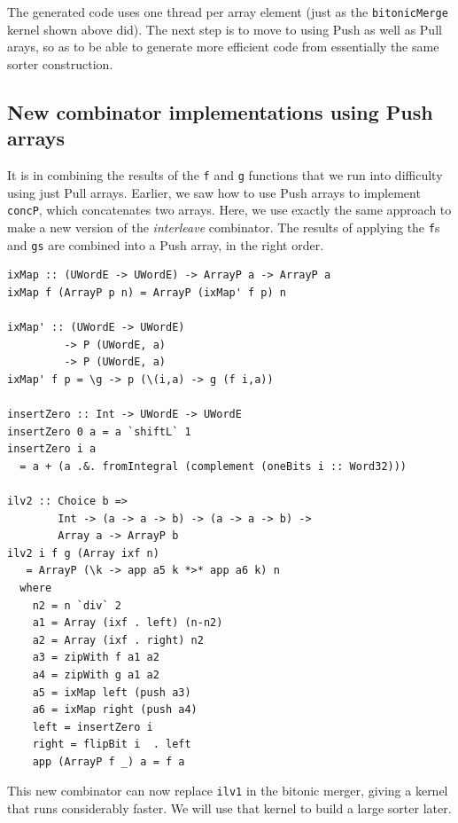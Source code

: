 The generated code
uses
one thread per array element (just as the {\tt bitonicMerge}
kernel shown above did). The next step is to move to using Push as
well as Pull arays, so as to be able to generate more efficient code
from essentially the same sorter construction.

\subsection{New combinator implementations using Push arrays}


It is in combining the results of the {\tt f} and {\tt g} functions
that we run into difficulty using just Pull arrays.
Earlier, we saw how to use Push arrays to implement {\tt concP},
which concatenates two arrays.
Here, we use exactly the same approach to make a new version of
the {\em interleave} combinator. The results of applying
the {\tt f}s and {\tt gs} are combined into a Push array, in the right
order.
\pagebreak
\begin{codesize}
\begin{verbatim}
ixMap :: (UWordE -> UWordE) -> ArrayP a -> ArrayP a 
ixMap f (ArrayP p n) = ArrayP (ixMap' f p) n

ixMap' :: (UWordE -> UWordE) 
         -> P (UWordE, a)
         -> P (UWordE, a) 
ixMap' f p = \g -> p (\(i,a) -> g (f i,a))

insertZero :: Int -> UWordE -> UWordE
insertZero 0 a = a `shiftL` 1
insertZero i a 
  = a + (a .&. fromIntegral (complement (oneBits i :: Word32)))

ilv2 :: Choice b => 
        Int -> (a -> a -> b) -> (a -> a -> b) -> 
        Array a -> ArrayP b
ilv2 i f g (Array ixf n) 
   = ArrayP (\k -> app a5 k *>* app a6 k) n
  where
    n2 = n `div` 2
    a1 = Array (ixf . left) (n-n2)
    a2 = Array (ixf . right) n2
    a3 = zipWith f a1 a2
    a4 = zipWith g a1 a2
    a5 = ixMap left (push a3)
    a6 = ixMap right (push a4)
    left = insertZero i
    right = flipBit i  . left
    app (ArrayP f _) a = f a
\end{verbatim}
\end{codesize}
\noindent
This new combinator can now replace {\tt ilv1} in the bitonic
merger, giving a kernel that runs considerably faster. We will use
that kernel to build a large sorter later.

